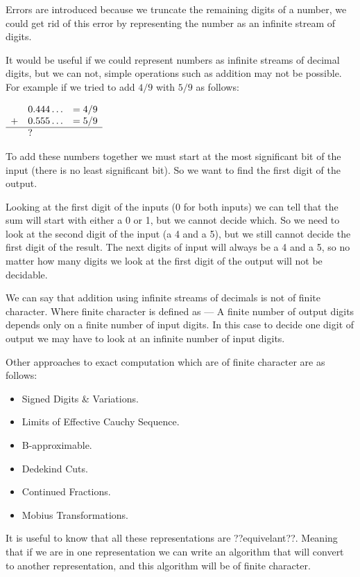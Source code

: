 Errors are introduced because we truncate the remaining digits of a number, we could get rid of this error by representing the number as an infinite stream of digits. 

It would be useful if we could represent numbers as infinite streams of decimal digits, but we can not, simple operations such as addition may not be possible. For example if we tried to add \(4/9\) with \(5/9\) as follows:

\begin{center}
\begin{math}
\begin{array}{rll}
& 0.444\ldots & = 4/9 \\
+ & 0.555 \ldots & = 5/9 \\ \hline
& ?
\end{array}
\end{math}
\end{center}

To add these numbers together we must start at the most significant bit of the input (there is no least significant bit). So we want to find the first digit of the output. 

Looking at the first digit of the inputs (0 for both inputs) we can tell that the sum will start with either a 0 or 1, but we cannot decide which. So we need to look at the second digit of the input (a 4 and a 5), but we still cannot decide the first digit of the result. The next digits of input will always be a 4 and a 5, so no matter how many digits we look at the first digit of the output will not be decidable. 

We can say that addition using infinite streams of decimals is not of finite character. Where finite character is defined as --- A finite number of output digits depends only on a finite number of input digits. In this case to decide one digit of output we may have to look at an infinite number of input digits.

Other approaches to exact computation which are of finite character are as follows:
\begin{itemize}
\item Signed Digits \& Variations.
\item Limits of Effective Cauchy Sequence.
\item B-approximable.
\item Dedekind Cuts.
\item Continued Fractions.
\item Mobius Transformations.
\end{itemize}
It is useful to know that all these representations are ??equivelant??. Meaning that if we are in one representation we can write an algorithm that will convert to another representation, and this algorithm will be of finite character.

